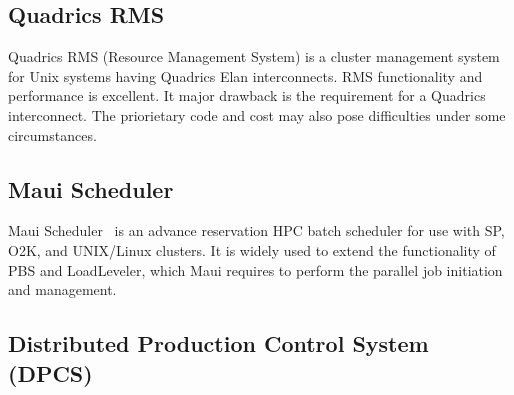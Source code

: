%
%


\subsection{Quadrics RMS}

Quadrics RMS\cite{Quadrics02}
(Resource Management System) is a cluster management system for 
Unix systems having Quadrics Elan interconnects. 
RMS functionality and performance is excellent. 
It major drawback is the requirement for a Quadrics interconnect. 
The priorietary code and cost may also pose difficulties under some 
circumstances.


\subsection*{Maui Scheduler}

Maui Scheduler~\cite{Maui} is an advance reservation HPC batch scheduler 
for use with SP, O2K, and UNIX/Linux clusters. 
It is widely used to extend the functionality of PBS and LoadLeveler, 
which Maui requires to perform the parallel job initiation and management.

\subsection*{Distributed Production Control System (DPCS)}

